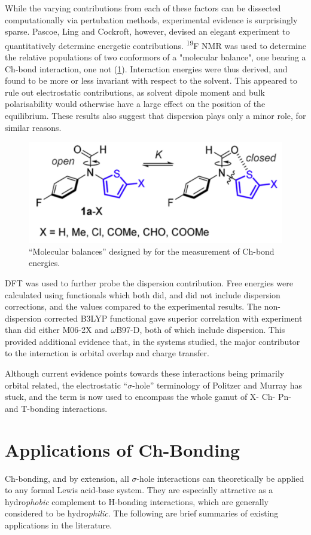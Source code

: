 \begin{refsection}
While the varying contributions from each of these factors can be dissected computationally via pertubation methods, experimental evidence is surprisingly sparse.
Pascoe, Ling and Cockroft, however, devised an elegant experiment to quantitatively determine energetic contributions.\autocite{Pascoe2017}
\textsuperscript{19}F NMR was used to determine the relative populations of two conformors of a "molecular balance", one bearing a Ch-bond interaction, one not (\cref{fig:cockroft-balances}).
Interaction energies were thus derived, and found to be more or less invariant with respect to the solvent.
This appeared to rule out electrostatic contributions, as solvent dipole moment and bulk polarisability would otherwise have a large effect on the position of the equilibrium.
These results also suggest that dispersion plays only a minor role, for similar reasons.

\begin{figure}
    \centering
    \includegraphics[width=0.6\linewidth]{Figures/cockroft-balances.pdf}
    \caption{``Molecular balances'' designed by \citeauthor[]{Pascoe2017} for the measurement of Ch-bond energies.\autocite{Pascoe2017}}
    \label{fig:cockroft-balances}
\end{figure}

DFT was used to further probe the dispersion contribution.
Free energies were calculated using functionals which both did, and did not include dispersion corrections, and the values compared to the experimental results.
The non-dispersion corrected B3LYP functional gave superior correlation with experiment than did either M06-2X and $\omega$B97-D, both of which include dispersion.
This provided additional evidence that, in the systems studied, the major contributor to the interaction is orbital overlap and charge transfer.

Although current evidence points towards these interactions being primarily orbital related, the electrostatic ``$\sigma$-hole'' terminology of Politzer and Murray has stuck, and the term is now used to encompass the whole gamut of X- Ch- Pn- and T-bonding interactions.

\section{Applications of Ch-Bonding}
Ch-bonding, and by extension, all $\sigma$-hole interactions can theoretically be applied to any formal Lewis acid-base system.
They are especially attractive as a hydro\emph{phobic} complement to H-bonding interactions, which are generally considered to be hydro\emph{philic}.
The following are brief summaries of existing applications in the literature.


\end{refsection}
